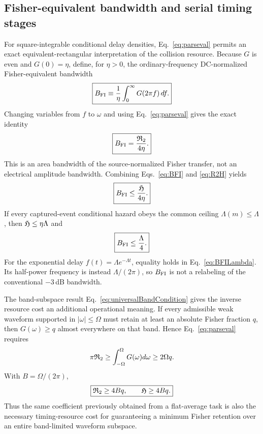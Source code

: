 \subsection{Fisher-equivalent bandwidth and serial timing stages}
\label{sec:bfi}

For square-integrable conditional delay densities, Eq.~\eqref{eq:parseval} permits an exact equivalent-rectangular interpretation of the collision resource. Because $G$ is even and $G(0)=\eta$, define, for $\eta>0$, the ordinary-frequency DC-normalized Fisher-equivalent bandwidth
\begin{equation}
\boxed{
B_{\rm FI}
\equiv
\frac{1}{\eta}\int_0^\infty G(2\pi f)\,df.}
\label{eq:BFIdef}
\end{equation}
Changing variables from $f$ to $\omega$ and using Eq.~\eqref{eq:parseval} gives the exact identity
\begin{equation}
\boxed{
B_{\rm FI}=\frac{\mathfrak R_2}{4\eta}.}
\label{eq:BFI}
\end{equation}
This is an area bandwidth of the source-normalized Fisher transfer, not an electrical amplitude bandwidth. Combining Eqs.~\eqref{eq:BFI} and \eqref{eq:R2H} yields
\begin{equation}
\boxed{
B_{\rm FI}\le\frac{\mathfrak H}{4\eta}.}
\label{eq:BFIH}
\end{equation}
If every captured-event conditional hazard obeys the common ceiling $\Lambda(m)\le\Lambda$, then $\mathfrak H\le\eta\Lambda$ and
\begin{equation}
\boxed{B_{\rm FI}\le\frac{\Lambda}{4}.}
\label{eq:BFILambda}
\end{equation}
For the exponential delay $f(t)=\Lambda e^{-\Lambda t}$, equality holds in Eq.~\eqref{eq:BFILambda}. Its half-power frequency is instead $\Lambda/(2\pi)$, so $B_{\rm FI}$ is not a relabeling of the conventional $-3\,$dB bandwidth.

The band-subspace result Eq.~\eqref{eq:universalBandCondition} gives the inverse resource cost an additional operational meaning. If every admissible weak waveform supported in $|\omega|\le\Omega$ must retain at least an absolute Fisher fraction $q$, then $G(\omega)\ge q$ almost everywhere on that band. Hence Eq.~\eqref{eq:parseval} requires
\begin{equation}
\pi\mathfrak R_2
\ge\int_{-\Omega}^{\Omega}G(\omega)d\omega
\ge2\Omega q.
\end{equation}
With $B=\Omega/(2\pi)$,
\begin{equation}
\boxed{
\mathfrak R_2\ge4Bq,
\qquad
\mathfrak H\ge4Bq.}
\label{eq:universalBandCost}
\end{equation}
Thus the same coefficient previously obtained from a flat-average task is also the necessary timing-resource cost for guaranteeing a minimum Fisher retention over an entire band-limited waveform subspace.

